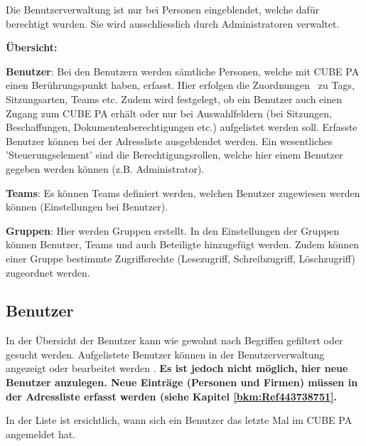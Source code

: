 Die Benutzerverwaltung ist nur bei Personen eingeblendet, welche dafür berechtigt wurden. Sie wird ausschliesslich durch Administratoren verwaltet.

\vspace{5cm}  

\textbf{Übersicht:}

\vspace{\baselineskip}

\textbf{Benutzer}: Bei den Benutzern werden sämtliche Personen, welche mit CUBE PA einen Berührungspunkt haben, erfasst. Hier erfolgen die Zuordnungen \ zu Tags, Sitzungsarten, Teams etc. Zudem wird festgelegt, ob ein Benutzer auch einen Zugang zum CUBE PA erhält oder nur bei Auswahlfeldern (bei Sitzungen, Beschaffungen, Dokumentenberechtigungen etc.) aufgelistet werden soll. Erfasste Benutzer können bei der Adressliste ausgeblendet werden. Ein wesentliches 'Steuerungselement' sind die Berechtigungsrollen, welche hier einem Benutzer gegeben werden können (z.B. Administrator).

\vspace{\baselineskip}

\textbf{Teams}: Es können Teams definiert werden, welchen Benutzer zugewiesen werden können (Einstellungen bei Benutzer).

\vspace{\baselineskip}

\textbf{Gruppen}: Hier werden Gruppen erstellt. In den Einstellungen der Gruppen können Benutzer, Teams und auch Beteiligte hinzugefügt werden. Zudem können einer Gruppe bestimmte Zugriffsrechte (Lesezugriff, Schreibzugriff, Löschzugriff) zugeordnet werden.

\subsection{Benutzer}
\label{bkm:Ref445362390}

In der Übersicht der Benutzer kann wie gewohnt nach Begriffen gefiltert oder gesucht werden. Aufgelistete Benutzer können in der Benutzerverwaltung angezeigt oder bearbeitet werden . \textbf{Es ist jedoch nicht möglich, hier neue Benutzer anzulegen. Neue Einträge (Personen und Firmen) müssen in der Adressliste erfasst werden (siehe Kapitel \ref{bkm:Ref443738751}.} \\

\vspace{\baselineskip}

In der Liste ist ersichtlich, wann sich ein Benutzer das letzte Mal im CUBE PA angemeldet hat. 


